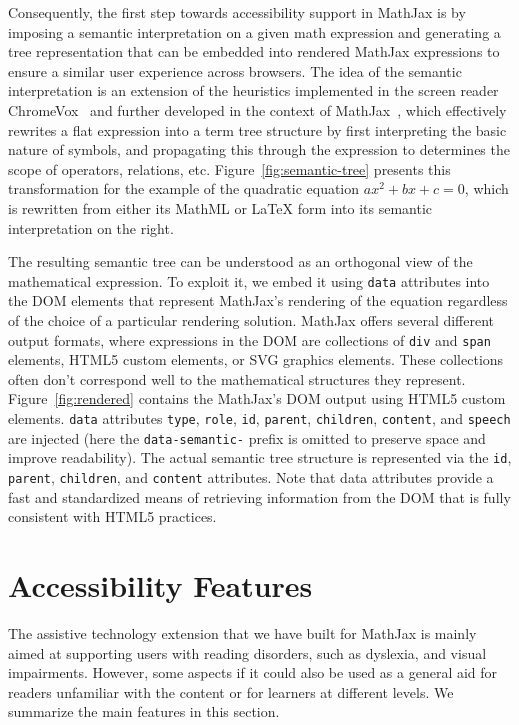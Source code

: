 \documentclass{sig-alternate}
\begin{document}
Consequently, the first step towards accessibility support in MathJax is by
imposing a semantic interpretation on a given math expression and generating a
tree representation that can be embedded into rendered MathJax expressions to
ensure a similar user experience across browsers. The idea of the semantic
interpretation is an extension of the heuristics implemented in the screen
reader ChromeVox~\cite{Sorge14} and further developed in the context of
MathJax~\cite{cervone2016towards}, which effectively rewrites a flat expression
into a term tree structure by first interpreting the basic nature of symbols, and
propagating this through the expression to determines the scope of operators,
relations, etc. Figure~\ref{fig:semantic-tree} presents this transformation for
the example of the quadratic equation $ax^2 + bx + c = 0$, which is rewritten
from either its MathML or {\LaTeX} form into its semantic interpretation on the
right.

The resulting semantic tree can be understood as an orthogonal view of the
mathematical expression. To exploit it, we embed it using \texttt{data}
attributes into the DOM elements that represent MathJax's rendering of the
equation regardless of the choice of a particular rendering solution. MathJax
offers several different output formats, where expressions in the DOM are
collections of \texttt{div} and \texttt{span} elements, HTML5 custom elements,
or SVG graphics elements. These collections often don't correspond well to the
mathematical structures they represent.  Figure~\ref{fig:rendered} contains the
MathJax's DOM output using HTML5 custom elements. \texttt{data} attributes
\texttt{type}, \texttt{role}, \texttt{id}, \texttt{parent}, \texttt{children},
\texttt{content}, and \texttt{speech} are injected (here the
\texttt{data-semantic-} prefix is omitted to preserve space and improve
readability). The actual semantic tree structure is represented via the
\texttt{id}, \texttt{parent}, \texttt{children}, and \texttt{content}
attributes. Note that data attributes provide a fast and standardized means of
retrieving information from the DOM that is fully consistent with HTML5
practices.


\section{Accessibility Features}
\label{sec:at-solution}

The assistive technology extension that we have built for MathJax is mainly
aimed at supporting users with reading disorders, such as dyslexia, and visual
impairments. However, some aspects if it could also be used as a general aid for
readers unfamiliar with the content or for learners at different levels. We
summarize the main features in this section.
\end{document}
